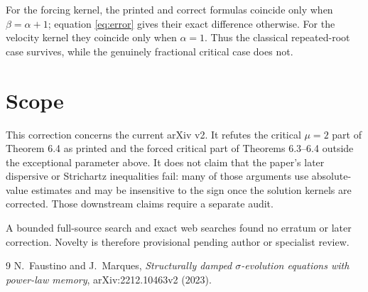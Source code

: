 \documentclass[11pt]{article}
\begin{document}
For the forcing kernel, the printed and correct formulas coincide only
when $\beta=\alpha+1$; equation \eqref{eq:error} gives their exact
difference otherwise.  For the velocity kernel they coincide only when
$\alpha=1$.  Thus the classical repeated-root case survives, while the
genuinely fractional critical case does not.

\section{Scope}

This correction concerns the current arXiv v2.  It refutes the critical
$\mu=2$ part of Theorem 6.4 as printed and the forced critical part of
Theorems 6.3--6.4 outside the exceptional parameter above.  It does not
claim that the paper's later dispersive or Strichartz inequalities fail:
many of those arguments use absolute-value estimates and may be insensitive
to the sign once the solution kernels are corrected.  Those downstream
claims require a separate audit.

A bounded full-source search and exact web searches found no erratum or
later correction.  Novelty is therefore provisional pending author or
specialist review.

\begin{thebibliography}{9}
N.~Faustino and J.~Marques,
\emph{Structurally damped $\sigma$-evolution equations with power-law
memory}, arXiv:2212.10463v2 (2023).
\end{thebibliography}
\end{document}
